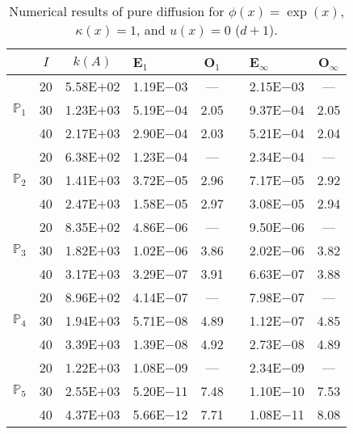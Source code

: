 \begin{table}[H]
\centering
\caption{Numerical results of pure diffusion for $\phi(x)=\exp(x)$, $\kappa(x)=1$, and $u(x)=0$ ($d+1$).}
\begin{tabular}{@{}l c c l c c l c@{}}
\toprule
 & $I$ & $k(A)$ & E$_1$ & O$_1$ && E$_{\infty}$ & O$_{\infty}$\\
\midrule
\multirow{3}{*}{$\mathbb{P}_{1}$}
 & 20 & 5.58E$+$02 & 1.19E$-$03 & --- && 2.15E$-$03 & ---\\
 & 30 & 1.23E$+$03 & 5.19E$-$04 & 2.05 && 9.37E$-$04 & 2.05\\
 & 40 & 2.17E$+$03 & 2.90E$-$04 & 2.03 && 5.21E$-$04 & 2.04\\
\midrule
\multirow{3}{*}{$\mathbb{P}_{2}$}
 & 20 & 6.38E$+$02 & 1.23E$-$04 & --- && 2.34E$-$04 & ---\\
 & 30 & 1.41E$+$03 & 3.72E$-$05 & 2.96 && 7.17E$-$05 & 2.92\\
 & 40 & 2.47E$+$03 & 1.58E$-$05 & 2.97 && 3.08E$-$05 & 2.94\\
\midrule
\multirow{3}{*}{$\mathbb{P}_{3}$}
 & 20 & 8.35E$+$02 & 4.86E$-$06 & --- && 9.50E$-$06 & ---\\
 & 30 & 1.82E$+$03 & 1.02E$-$06 & 3.86 && 2.02E$-$06 & 3.82\\
 & 40 & 3.17E$+$03 & 3.29E$-$07 & 3.91 && 6.63E$-$07 & 3.88\\
\midrule
\multirow{3}{*}{$\mathbb{P}_{4}$}
 & 20 & 8.96E$+$02 & 4.14E$-$07 & --- && 7.98E$-$07 & ---\\
 & 30 & 1.94E$+$03 & 5.71E$-$08 & 4.89 && 1.12E$-$07 & 4.85\\
 & 40 & 3.39E$+$03 & 1.39E$-$08 & 4.92 && 2.73E$-$08 & 4.89\\
\midrule
\multirow{3}{*}{$\mathbb{P}_{5}$}
 & 20 & 1.22E$+$03 & 1.08E$-$09 & --- && 2.34E$-$09 & ---\\
 & 30 & 2.55E$+$03 & 5.20E$-$11 & 7.48 && 1.10E$-$10 & 7.53\\
 & 40 & 4.37E$+$03 & 5.66E$-$12 & 7.71 && 1.08E$-$11 & 8.08\\
\bottomrule
\end{tabular}
\end{table}